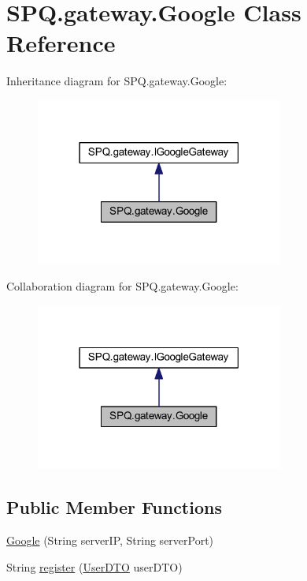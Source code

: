 \hypertarget{class_s_p_q_1_1gateway_1_1_google}{}\section{S\+P\+Q.\+gateway.\+Google Class Reference}
\label{class_s_p_q_1_1gateway_1_1_google}


Inheritance diagram for S\+P\+Q.\+gateway.\+Google\+:\nopagebreak
\begin{figure}[H]
\begin{center}
\leavevmode
\includegraphics[width=231pt]{class_s_p_q_1_1gateway_1_1_google__inherit__graph}
\end{center}
\end{figure}


Collaboration diagram for S\+P\+Q.\+gateway.\+Google\+:\nopagebreak
\begin{figure}[H]
\begin{center}
\leavevmode
\includegraphics[width=231pt]{class_s_p_q_1_1gateway_1_1_google__coll__graph}
\end{center}
\end{figure}
\subsection*{Public Member Functions}
\begin{DoxyCompactItemize}
\item 
\mbox{\hyperlink{class_s_p_q_1_1gateway_1_1_google_a8b232ea9ca746c4500b6c02e86b76fef}{Google}} (String server\+IP, String server\+Port)
\item 
String \mbox{\hyperlink{class_s_p_q_1_1gateway_1_1_google_ab287ce4fd789224c45be6037a99a937b}{register}} (\mbox{\hyperlink{class_s_p_q_1_1dto_1_1_user_d_t_o}{User\+D\+TO}} user\+D\+TO)
\end{DoxyCompactItemize}


